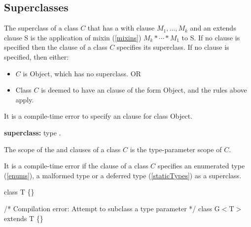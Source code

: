 \documentclass{article}
\newcommand{\code}[1]{{\sf #1}}
\begin{document}
\subsection{Superclasses}

\LMHash{}
The superclass of a class $C$ that has a with clause \code{\WITH{} $M_1, \ldots, M_k$} and an extends clause \code{\EXTENDS{} S} is the application of mixin (\ref{mixins}) $M_k* \cdots * M_1$  to S.  If no \WITH{} clause is specified then  the \EXTENDS{} clause of a class $C$ specifies its superclass. If no \EXTENDS{} clause is specified, then either:
\begin{itemize}
\item $C$ is \code{Object}, which has no superclass. OR
\item Class $C$ is  deemed to have an \EXTENDS{} clause of the form \code{\EXTENDS{} Object}, and the rules above apply. 
\end{itemize}

\LMHash{}
It is a compile-time error to specify an \EXTENDS{} clause for class \code{Object}.

\begin{grammar}
{\bf superclass:}
      \EXTENDS{} type
    .
\end{grammar}


\LMHash{}
The scope of the \EXTENDS{} and \WITH{} clauses of a class $C$ is the type-parameter scope of $C$.

\LMHash{}
It is a compile-time error if  the \EXTENDS{} clause of a class $C$ specifies an enumerated type (\ref{enums}), a malformed  type or a deferred type (\ref{staticTypes}) as a superclass.


\begin{dartCode}
class T \{\}

/* Compilation error: Attempt to subclass a type parameter */
class G$<$T$>$ extends T \{\} 

\end{dartCode}
\end{document}
